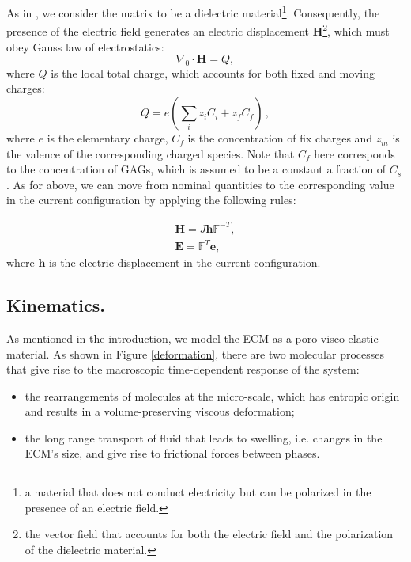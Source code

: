 \documentclass[runningheads]{llncs}
\newcommand{\F}{\ensuremath{\mathbb{F}}}
\begin{document}
As in \cite{Reviewpolyel}, we consider the matrix to be a dielectric material\footnote{a material that does not conduct electricity but can be polarized in the presence of an electric field.}. Consequently, the presence of the electric field generates an electric displacement $\mathbf{H}$\footnote{the vector field that accounts for both the electric field and the polarization of the dielectric material.}, which must obey Gauss law of electrostatics:
\begin{equation}
\nabla_0 \cdot \mathbf{H}= Q,
\label{gauss}
\end{equation}
where $Q$ is the local total charge, which accounts for both fixed and moving charges:
\begin{equation}
Q = e\left(\sum\limits_{i} z_i C_i+z_f C_{f}\right)\, , \label{Q}
\end{equation}
where $e$ is the elementary charge, $C_f$ is the concentration of fix charges and $z_m$ is the valence of the corresponding charged species. Note that $C_f$ here corresponds to the concentration of GAGs, which is assumed to be a constant a fraction of $C_s$. As for above, we can move from nominal quantities to the corresponding value in the current configuration by applying the following rules:

\begin{eqnarray}
\mathbf{H} = J \mathbf{h}\F^{-T},\\
\mathbf{E} = \F^T \mathbf{e},
\end{eqnarray}
where $\mathbf{h}$ is the electric displacement in the current configuration.

\subsection{Kinematics.}
\label{kin}

As mentioned in the introduction, we model the ECM as a poro-visco-elastic material. As shown in Figure \ref{deformation}, there are two molecular processes that give rise to the macroscopic time-dependent response of the system: 
\begin{itemize}
	\item [1.] the rearrangements of molecules at the micro-scale,  which has entropic origin and results in a volume-preserving viscous deformation;
	\item[2.] the long range transport of fluid that leads to swelling, i.e. changes in the ECM's size, and give rise to frictional forces between phases. 
\end{itemize}
\end{document}
